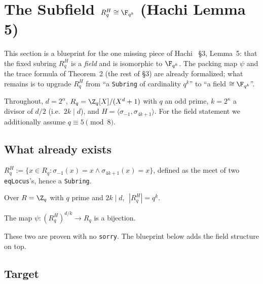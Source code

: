 \section{The Subfield $R_q^H \cong \F_{q^k}$ (Hachi Lemma 5)}\label{sec:hachi_subfield}

This section is a blueprint for the one missing piece of Hachi~\cite{NOZ26} \S3, Lemma~5:
that the fixed subring $R_q^H$ is a \emph{field} and is isomorphic to $\F_{q^k}$.
The packing map $\psi$ and the trace formula of Theorem~2 (the rest of \S3) are already
formalized; what remains is to upgrade $R_q^H$ from ``a \texttt{Subring} of cardinality $q^k$''
to ``a field $\cong \F_{q^k}$''.

Throughout, $d = 2^\alpha$, $R_q = \Z_q[X]/(X^{d}+1)$ with $q$ an odd prime, $k = 2^\kappa$ a
divisor of $d/2$ (i.e.\ $2k \mid d$), and $H = \langle \sigma_{-1}, \sigma_{4k+1}\rangle$.
For the field statement we additionally assume $q \equiv 5 \pmod 8$.

\subsection{What already exists}

\begin{definition}\label{def:fixedSubring}
\leanok
$R_q^H := \{x \in R_q : \sigma_{-1}(x) = x \wedge \sigma_{4k+1}(x) = x\}$, defined as the meet of
two \texttt{eqLocus}'s, hence a \texttt{Subring}.
\end{definition}

\begin{theorem}[Cardinality, Eq.~7]\label{thm:card_fixedSubring}
\leanok
{}
Over $R = \Z_q$ with $q$ prime and $2k \mid d$, $\;|R_q^H| = q^{k}$.
\end{theorem}

\begin{theorem}\label{thm:psi_bijective}
\leanok
{}
The map $\psi : (R_q^H)^{d/k} \to R_q$ is a bijection.
\end{theorem}

These two are proven with no \texttt{sorry}. The blueprint below adds the field structure on top.

\subsection{Target}

